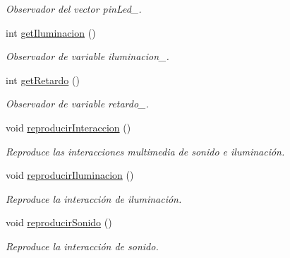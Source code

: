 \begin{DoxyCompactItemize}
\begin{DoxyCompactList}\small\item\em Observador del vector pin\+Led\+\_\+. \end{DoxyCompactList}\item 
int \hyperlink{classInteraccion_a1f36975ed2a6163b6ae16f56edcc4285}{get\+Iluminacion} ()
\begin{DoxyCompactList}\small\item\em Observador de variable iluminacion\+\_\+. \end{DoxyCompactList}\item 
int \hyperlink{classInteraccion_ac4eedd10ae26a85e19c421d3f8024996}{get\+Retardo} ()
\begin{DoxyCompactList}\small\item\em Observador de variable retardo\+\_\+. \end{DoxyCompactList}\item 
void \hyperlink{classInteraccion_a201bf7c2fc701649fb636f2440f8b706}{reproducir\+Interaccion} ()\hypertarget{classInteraccion_a201bf7c2fc701649fb636f2440f8b706}{}\label{classInteraccion_a201bf7c2fc701649fb636f2440f8b706}

\begin{DoxyCompactList}\small\item\em Reproduce las interacciones multimedia de sonido e iluminación. \end{DoxyCompactList}\item 
void \hyperlink{classInteraccion_a46fe9723017b35ed447e377aef2a58e8}{reproducir\+Iluminacion} ()\hypertarget{classInteraccion_a46fe9723017b35ed447e377aef2a58e8}{}\label{classInteraccion_a46fe9723017b35ed447e377aef2a58e8}

\begin{DoxyCompactList}\small\item\em Reproduce la interacción de iluminación. \end{DoxyCompactList}\item 
void \hyperlink{classInteraccion_a2f70fe1701d309d606a3b86787e332cc}{reproducir\+Sonido} ()\hypertarget{classInteraccion_a2f70fe1701d309d606a3b86787e332cc}{}\label{classInteraccion_a2f70fe1701d309d606a3b86787e332cc}

\begin{DoxyCompactList}\small\item\em Reproduce la interacción de sonido. \end{DoxyCompactList}\end{DoxyCompactItemize}


